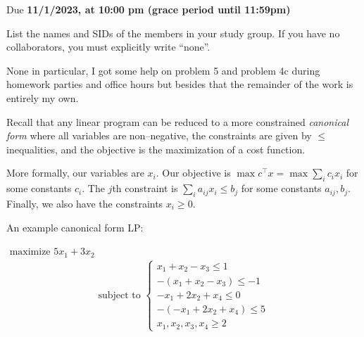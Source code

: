 \documentclass[11pt]{article}
\def\duedate{11/1/2023, at 10:00 pm (grace period until 11:59pm)}
\begin{document}
\maketitle


Due \textbf{\duedate}

List the names and SIDs of the members in your study group.
If you have no collaborators, you must explicitly write ``none''.

\begin{solution}
	None in particular, I got some help on problem 5 and problem 4c during homework parties and office hours but
	besides that the remainder of the work is entirely my own.
\end{solution}

\newpage

Recall that any linear program can be reduced to a more constrained \emph{canonical form} where all variables are non--negative, the constraints are given by $\leq$ inequalities, and the objective is the maximization of a cost function. 

\noindent More formally, our variables are $x_i$. Our objective is $\max c^\top x = \max \sum_i c_i x_i$ for some constants $c_i$. The $j$th constraint is  $\sum_i a_{ij} x_i \leq b_j$ for some constants $a_{ij}, b_j$. Finally, we also have the constraints $x_i \geq 0$.

\noindent An example canonical form LP: 
\begin{center}
$\mbox{ maximize } 5x_1 + 3x_2$
\begin{align*}
\text{subject to } \begin{cases} x_1 + x_2 - x_3 \leq 1 \\
-(x_1 + x_2 - x_3) \leq -1 \\
-x_1 + 2x_2 + x_4 \leq 0 \\ 
-(-x_1 + 2x_2 + x_4) \leq 5 \\
x_1, x_2, x_3, x_4 \ge 2
\end{cases}
\end{align*}
\end{center} 
\end{document}
